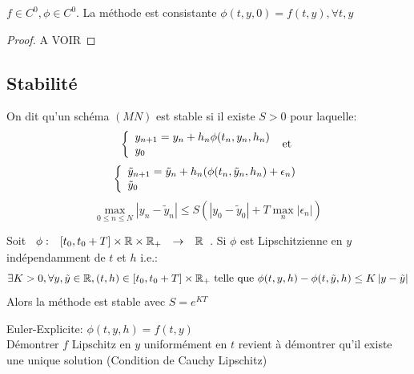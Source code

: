 \documentclass[]{report}
\begin{document}
    \begin{re}{}{}
        $f\in C^0,\phi\in C^0$. La méthode est consistante \ssi $\phi(t,y,0)=f(t,y),\forall t,y$
    \end{re}

    \begin{proof}
        A VOIR
    \end{proof}

    \subsection{Stabilité}

    \begin{df}{}{}
        On dit qu'un schéma $(MN)$ est stable si il existe $S>0$ pour laquelle:
        \[\left\{\begin{array}{ll} y_{n+1}=y_n+h_n\phi(t_n,y_n,h_n)\\ y_0 \end{array} \right.\text{ et }\]
        \[\left\{\begin{array}{ll} \tilde{y}_{n+1}=\tilde{y}_n+h_n(\phi(t_n,\tilde{y}_n,h_n)+\epsilon_n)\\ \tilde{y}_0 \end{array} \right.\]
        \[\max_{0\le n\le N}\left|y_n-\tilde{y}_n\right|\le S\left(\left|y_0-\tilde{y}_0\right|+T\max_n\left|\epsilon_n\right|\right)\]
    \end{df}

    \begin{prop}{}{}
        Soit $\begin{array}{ccccc} \phi : & [t_0,t_0+T]\times \mathbb{R}\times \mathbb{R}_+ & \to & \mathbb{R} \end{array}$. Si $\phi$ est Lipschitzienne en $y$ indépendamment de $t$ et $h$ i.e.:
        \[\exists K>0,\forall y,\tilde{y}\in \mathbb{R}, (t,h)\in [t_0,t_0+T]\times \mathbb{R}_+\text{ telle que }\phi(t,y,h)-\phi(t,\tilde{y},h)\le K\left|y-\tilde{y}\right|\]
        Alors la méthode est stable avec $S=e^{KT}$
    \end{prop}

    \begin{ex}{}{}
        Euler-Explicite: $\phi(t,y,h)=f(t,y)$\\
        Démontrer $f$ Lipschitz en $y$ uniformément en $t$ revient à démontrer qu'il existe une unique solution (Condition de Cauchy Lipschitz)
    \end{ex}
\end{document}
